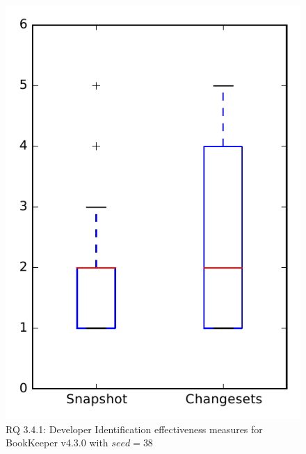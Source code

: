 
\begin{figure}
\centering
\includegraphics[height=0.4\textheight]{figures/dit_seed/rq1_bookkeeper_38}
\caption{RQ 3.4.1: Developer Identification effectiveness measures for BookKeeper v4.3.0 with $seed=38$}
\label{fig:dit_seed:rq1:bookkeeper}
\end{figure}
